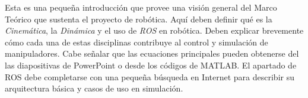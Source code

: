 Esta es una pequeña introducción que provee una visión general del Marco Teórico que sustenta el proyecto de robótica. 
Aquí deben definir qué es la \textit{Cinemática}, la \textit{Dinámica} y el uso de \textit{ROS} en robótica. Deben explicar brevemente cómo cada una de estas disciplinas contribuye al control y simulación de manipuladores. Cabe señalar que las ecuaciones principales pueden obtenerse del las diapositivas de PowerPoint o desde los códigos de MATLAB. El apartado de ROS debe completarse con una pequeña búsqueda en Internet para describir su arquitectura básica y casos de uso en simulación.

